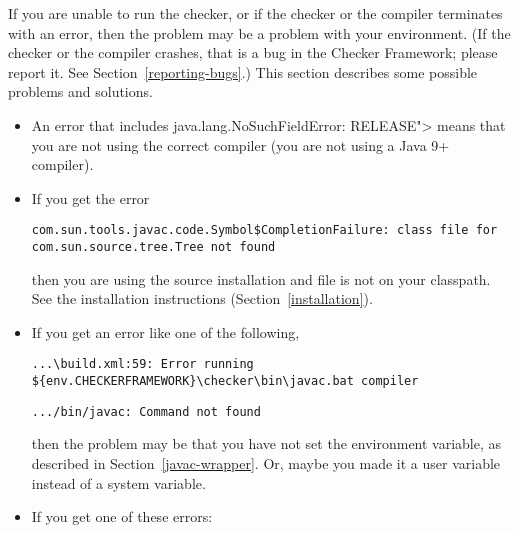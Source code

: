 
If you are unable to run the checker, or if the checker or the compiler
terminates with an error, then the problem may be a problem with your environment.
(If the checker or the compiler crashes, that is a bug in the Checker
Framework; please report it.  See Section~\ref{reporting-bugs}.)
This section describes some possible problems and solutions.

\begin{itemize}
\item
  \label{no-such-field-error-release}
  An error that includes \<java.lang.NoSuchFieldError: RELEASE"> means that
  you are not using the correct compiler (you are not using a Java 9+ compiler).

\item
If you get the error

\begin{smaller}
\begin{Verbatim}
com.sun.tools.javac.code.Symbol$CompletionFailure: class file for com.sun.source.tree.Tree not found
\end{Verbatim}
\end{smaller}

\noindent
then you are using the source installation and file  is not
on your classpath.  See the installation instructions
(Section~\ref{installation}).

\item
If you get an error like one of the following,

\begin{smaller}
\begin{Verbatim}
...\build.xml:59: Error running ${env.CHECKERFRAMEWORK}\checker\bin\javac.bat compiler
\end{Verbatim}

\begin{Verbatim}
.../bin/javac: Command not found
\end{Verbatim}
\end{smaller}

\noindent
then the problem may be that you have not set the  environment
variable, as described in Section~\ref{javac-wrapper}.  Or, maybe
you made it a user variable instead of a system variable.

\item
If you get one of these errors:


\end{itemize}
